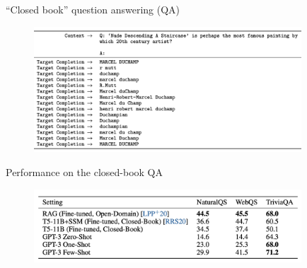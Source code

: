 
\begin{vbframe}{``Closed book'' question answering (QA)}

\vfill
			
	\begin{figure}
		\centering
		\includegraphics[width=10cm]{figure/triviaformat.png}\\
	\end{figure}
	
\vfill

\end{vbframe}


\begin{vbframe}{Performance on the closed-book QA}

\vfill

	\begin{figure}
		\centering
		\includegraphics[width=10cm]{figure/triviaperf.png}\\
	\end{figure}

\vfill

\end{vbframe}


